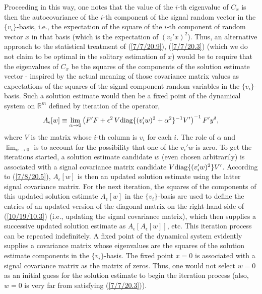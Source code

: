 \documentclass{amsart}
\numberwithin{equation}{section}
\theoremstyle{definition}
\numberwithin{theorem}{section}
\begin{document}
{Proceeding in this way, one notes that the value of the $i$-th eigenvalue of $C_x$ is then the autocovariance of the $i$-th component of the signal random vector in the $\{v_i\}$-basis, i.e., the expectation of the square of the $i$-th component of random vector  $x$ in that basis (which is the expectation of $(v_i'x)^2$).   Thus, an alternative approach to the statistical treatment of (\ref{7/7/20.9}), (\ref{7/7/20.3}) (which we do not claim to be optimal in the solitary estimation of $x$)  would be to require that the eigenvalues of $C_x$ be the squares of the components of the solution estimate vector -  inspired by the actual meaning of those covariance matrix values as expectations  of the squares of the signal component random variables in the $\{v_i\}$-basis.  Such a solution estimate would then be  a fixed point of the dynamical system on $\mathbb{R}^m$ defined by iteration of the operator, \begin{equation}\label{10/19/10.3} A_\epsilon[w] \equiv \lim_{\alpha\rightarrow 0}\left(F'F+\epsilon^2\, V\mbox{\rm diag}\{(v_i'w)^2 + \alpha^2\}^{-1}V' \right)^{-1} F'y^\delta, \end{equation} where $V$ is the matrix whose $i$-th column is $v_i$ for each $i$. The role of $\alpha$ and $\lim_{\alpha\rightarrow 0}$ is to account for the possibility that one of the $v_i'w$ is zero.  To get the iterations started,  a solution estimate candidate $w$ (even chosen arbitrarily) is associated with a signal covariance matrix candidate $V \mbox{\rm diag}\{(v _i'w)^2\}V'$.    According to (\ref{7/8/20.5}),  $A_\epsilon[w]$ is then an updated solution estimate using the latter signal covariance matrix.  For the next iteration, the squares of the components of this updated solution estimate  $A_\epsilon[w]$ in the $\{v_i\}$-basis are used to define the entries of an updated version of the diagonal matrix on the right-hand-side of (\ref{10/19/10.3}) (i.e., updating the signal covariance matrix), which then supplies a successive updated solution estimate as $A_\epsilon[A_\epsilon[w]]$, etc. This iteration process can be repeated indefinitely.  A fixed point of the dynamical system evidently supplies a covariance matrix whose eigenvalues are the squares of the solution estimate components in the $\{v_i\}$-basis.  
 The fixed point $x=0$ is associated with a signal covariance matrix as the matrix of zeros. Thus, one would not select $w=0$ as an initial guess for the solution estimate to begin the iteration process (also, $w=0$ is very far from satisfying (\ref{7/7/20.3})).  
 
}
\end{document}
